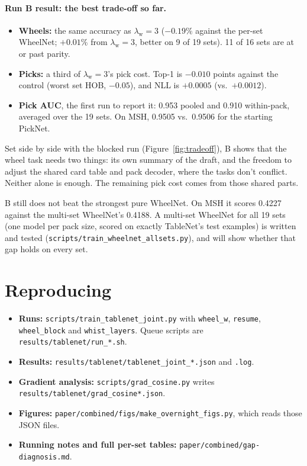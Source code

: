 \documentclass[11pt,letterpaper]{article}
\newcommand{\code}[1]{\texttt{\small #1}}
\newcommand{\lw}{\lambda_{\text{w}}}
\begin{document}
\paragraph{Run B result: the best trade-off so far.}
\begin{itemize}
\item \textbf{Wheels:} the same accuracy as $\lw=3$ ($-0.19\%$ against the per-set WheelNet; $+0.01\%$ from
$\lw=3$, better on 9 of 19 sets). 11 of 16 sets are at or past parity.
\item \textbf{Picks:} a third of $\lw=3$'s pick cost. Top-1 is $-0.010$ points against the control (worst set HOB,
$-0.05$), and NLL is $+0.0005$ (vs.\ $+0.0012$).
\item \textbf{Pick AUC}, the first run to report it: 0.953 pooled and 0.910 within-pack, averaged over the 19 sets.
On MSH, 0.9505 vs.\ 0.9506 for the starting PickNet.
\end{itemize}
Set side by side with the blocked run (Figure~\ref{fig:tradeoff}), B shows that the wheel task needs two things:
its own summary of the draft, and the freedom to adjust the shared card table and pack decoder, where the tasks
don't conflict. Neither alone is enough. The remaining pick cost comes from those shared parts.

B still does not beat the strongest pure WheelNet. On MSH it scores 0.4227 against the multi-set WheelNet's
0.4188. A multi-set WheelNet for all 19 sets (one model per pack size, scored on exactly TableNet's test examples)
is written and tested (\code{scripts/train\_wheelnet\_allsets.py}), and will show whether that gap holds on every
set.

\section{Reproducing}

\begin{itemize}
\item \textbf{Runs:} \code{scripts/train\_tablenet\_joint.py} with \code{wheel\_w}, \code{resume},
\code{wheel\_block} and \code{whist\_layers}. Queue scripts are \code{results/tablenet/run\_*.sh}.
\item \textbf{Results:} \code{results/tablenet/tablenet\_joint\_*.json} and \code{.log}.
\item \textbf{Gradient analysis:} \code{scripts/grad\_cosine.py} writes \code{results/tablenet/grad\_cosine*.json}.
\item \textbf{Figures:} \code{paper/combined/figs/make\_overnight\_figs.py}, which reads those JSON files.
\item \textbf{Running notes and full per-set tables:} \code{paper/combined/gap-diagnosis.md}.
\end{itemize}
\end{document}
